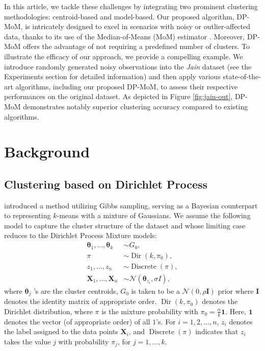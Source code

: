 \documentclass{article}
\newcommand{\bX}{\boldsymbol{X}}
\begin{document}
In this article, we tackle these challenges by integrating two prominent clustering methodologies: centroid-based and model-based. Our proposed algorithm, DP-MoM, is intricately designed to excel in scenarios with noisy or outlier-affected data, thanks to its use of the Median-of-Means (MoM) estimator \cite{nemirovsky1983wiley,devroye-MoM}. Moreover, DP-MoM offers the advantage of not requiring a predefined number of clusters. To illustrate the efficacy of our approach, we provide a compelling example. We introduce randomly generated noisy observations into the \textit{Jain} dataset \cite{jain-dataset} (see the Experiments section for detailed information) and then apply various state-of-the-art algorithms, including our proposed DP-MoM, to assess their respective performances on the original dataset. As depicted in Figure \ref{fig:jain-out}, DP-MoM demonstrates notably superior clustering accuracy compared to existing algorithms.

\section{Background}
\label{gen_inst}

\subsection{Clustering based on Dirichlet Process}

\cite{DP-Means} introduced a method utilizing Gibbs sampling, serving as a Bayesian counterpart to representing $k$-means with a mixture of Gaussians. We assume the following model to capture the cluster structure of the dataset and whose limiting case reduces to the Dirichlet Process Mixture models:
\begin{align*}
\boldsymbol{\theta}_1, \ldots, \boldsymbol{\theta}_{{k}} & \sim {G}_0, \\
\pi & \sim \operatorname{Dir}\left({k}, \pi_0\right), \\
{z}_1, \ldots, {z}_{{n}} & \sim \operatorname{Discrete}(\pi), \\
{\bX}_1, \ldots, {\bX}_{{n}} & \sim \mathcal{N}\left(\boldsymbol{\theta}_{{z}_{{i}}}, \sigma I\right),
\end{align*}
where $\boldsymbol{\theta}_{{j}}$ 's are the cluster centroids, ${G}_0$ is taken to be a $\mathcal{N}(0, \rho \mathbf{I})$ prior where $\mathbf{I}$ denotes the identity matrix of appropriate order. $\operatorname{Dir}\left({k}, \pi_0\right)$ denotes the Dirichlet distribution, where $\pi$ is the mixture probability with $\pi_0=\frac{\alpha}{k} \mathbf{1}$. Here, $\mathbf{1}$  denotes the vector (of appropriate order) of all $1$'s. For $i = 1,2,\ldots,n$, ${z}_{{i}}$ denotes the label assigned to the data points ${\bX}_{{i}}$, and  $\operatorname{Discrete}(\pi)$ indicates that ${z}_{{i}}$ takes the value $j$ with probability $\pi_{{j}}$, for ${j}=1, \ldots, {k}$.
\end{document}
